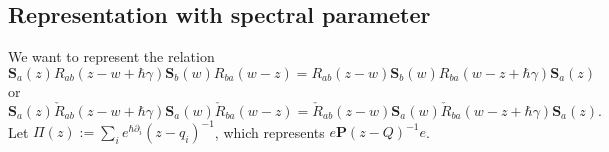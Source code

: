 \documentclass[11pt]{report}
\theoremstyle{definition}
\theoremstyle{remark}
\theoremstyle{remark}
\begin{document}
%
%

\subsection{Representation with spectral parameter}

We want to represent the relation
\begin{equation*}
\mathbf{S}_a(z) R_{ab}(z-w+\hbar\gamma) \mathbf{S}_b(w) R_{ba}(w-z) = R_{ab}(z-w) \mathbf{S}_b(w) R_{ba}(w-z+\hbar\gamma) \mathbf{S}_a(z)
\end{equation*}
or
\begin{equation*}
\mathbf{S}_a(z) \check R_{ab}(z-w+\hbar\gamma) \mathbf{S}_a(w) \check R_{ba}(w-z) = \check R_{ab}(z-w) \mathbf{S}_a(w) \check R_{ba}(w-z+\hbar\gamma) \mathbf{S}_a(z).
\end{equation*}
Let $\Pi(z) := \sum_i e^{\hbar\partial_i} (z-q_i)^{-1}$, which represents $e \mathbf{P} (z-Q)^{-1} e$.
\end{document}
